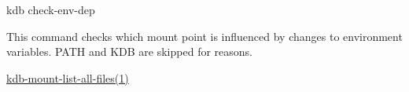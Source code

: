 {\ttfamily kdb check-\/env-\/dep}

This command checks which mount point is influenced by changes to environment variables. {\ttfamily P\+A\+TH} and {\ttfamily K\+DB} are skipped for reasons.


\begin{DoxyItemize}
\item \mbox{\hyperlink{doc_help_kdb-mount-list-all-files_md}{kdb-\/mount-\/list-\/all-\/files(1)}} 
\end{DoxyItemize}